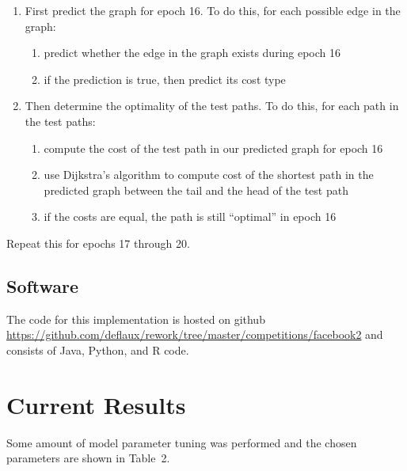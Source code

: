 \documentclass{article} %
\begin{document}
\begin{enumerate}
\item First predict the graph for epoch 16.  To do this, for each possible edge in the graph:
  \begin{enumerate}
  \item predict whether the edge in the graph exists during epoch 16
  \item if the prediction is true, then predict its cost type
  \end{enumerate}
\item Then determine the optimality of the test paths.  To do this, for each path in the test paths:
  \begin{enumerate}
  \item compute the cost of the test path in our predicted graph for epoch 16
  \item use Dijkstra's algorithm to compute cost of the shortest path in the
    predicted graph between the tail and the head of the test path
  \item if the costs are equal, the path is still ``optimal'' in epoch 16
  \end{enumerate}
\end{enumerate}

Repeat this for epochs 17 through 20.

\subsection{Software}

The code for this implementation is hosted on github
\url{https://github.com/deflaux/rework/tree/master/competitions/facebook2}
and consists of Java, Python, and R code.



\section{Current Results}

Some amount of model parameter tuning was performed and the chosen
parameters are shown in Table~2.
\end{document}
